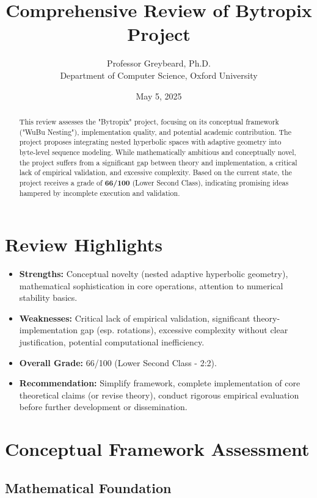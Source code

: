 \documentclass[11pt]{article}
\title{\Large\textbf{Comprehensive Review of Bytropix Project}}
\author{Professor Greybeard, Ph.D. \\ Department of Computer Science, Oxford University}
\date{May 5, 2025} %
\begin{document}
\maketitle

\begin{abstract}
This review assesses the "Bytropix" project, focusing on its conceptual framework ("WuBu Nesting"), implementation quality, and potential academic contribution. The project proposes integrating nested hyperbolic spaces with adaptive geometry into byte-level sequence modeling. While mathematically ambitious and conceptually novel, the project suffers from a significant gap between theory and implementation, a critical lack of empirical validation, and excessive complexity. Based on the current state, the project receives a grade of \textbf{66/100} (Lower Second Class), indicating promising ideas hampered by incomplete execution and validation.
\end{abstract}

\section*{Review Highlights}
\begin{itemize}[noitemsep]
    \item \textbf{Strengths:} Conceptual novelty (nested adaptive hyperbolic geometry), mathematical sophistication in core operations, attention to numerical stability basics.
    \item \textbf{Weaknesses:} Critical lack of empirical validation, significant theory-implementation gap (esp. rotations), excessive complexity without clear justification, potential computational inefficiency.
    \item \textbf{Overall Grade:} 66/100 (Lower Second Class - 2:2).
    \item \textbf{Recommendation:} Simplify framework, complete implementation of core theoretical claims (or revise theory), conduct rigorous empirical evaluation before further development or dissemination.
\end{itemize}

\section{Conceptual Framework Assessment}

\subsection{Mathematical Foundation}
\end{document}
